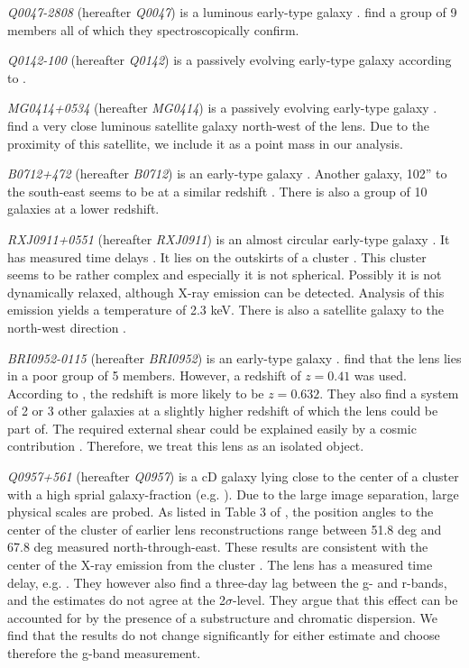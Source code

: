 \documentclass[useAMS,usenatbib]{mn2e}
\begin{document}
\textit{Q0047-2808} (hereafter \textit{Q0047}) is a luminous early-type galaxy \citep{1996MNRAS.278..139W}. \cite{2011ApJ...726...84W} find a group of 9 members all of which they spectroscopically confirm.

\textit{Q0142-100} (hereafter \textit{Q0142}) is a passively evolving early-type galaxy according to \citep{2000ApJ...536..584L,2007A&A...465...51E}.

\textit{MG0414+0534} (hereafter \textit{MG0414}) is a passively evolving early-type galaxy \citep{1999AJ....117.2034T}. \cite{1993AJ....105....1S} find a very close luminous satellite galaxy north-west of the lens. Due to the proximity of this satellite, we include it as a point mass in our analysis.

\textit{B0712+472} (hereafter \textit{B0712}) is an early-type galaxy \citep{1998AJ....115..377F}. Another galaxy, 102'' to the south-east seems to be at a similar redshift \citep{2002AJ....123..627F}. There is also a group of 10 galaxies at a lower redshift.

\textit{RXJ0911+0551} (hereafter \textit{RXJ0911}) is an almost circular early-type galaxy \citep{2012A&A...538A..99S}. It has measured time delays \citep{2002ApJ...572L..11H}. It lies on the outskirts of a cluster \citep{2001ApJ...555....1M}. This cluster seems to be rather complex and especially it is not spherical. Possibly it is not dynamically relaxed, although X-ray emission can be detected. Analysis of this emission yields a temperature of 2.3 keV. There is also a satellite galaxy to the north-west direction \citep{2000ApJ...544L..35K}.

\textit{BRI0952-0115} (hereafter \textit{BRI0952}) is an early-type galaxy \citep{2000ApJ...536..584L,2007A&A...465...51E}. \cite{2006ApJ...641..169M} find that the lens lies in a poor group of 5 members. However, a redshift of $z=0.41$ was used. According to \cite{2007A&A...465...51E}, the redshift is more likely to be $z=0.632$. They also find a system of 2 or 3 other galaxies at a slightly higher redshift of which the lens could be part of. The required external shear could be explained easily by a cosmic contribution \citep{2000ApJ...536..584L}. Therefore, we treat this lens as an isolated object.

\textit{Q0957+561} (hereafter \textit{Q0957}) is a cD galaxy lying close to the center of a cluster with a high sprial galaxy-fraction (e.g. \cite{1992MNRAS.254P..27G,1994A&A...291..411A,1998ApJ...504..661C}). Due to the large image separation, large physical scales are probed. As listed in Table 3 of \cite{2000ApJ...542...74K}, the position angles to the center of the cluster of earlier lens reconstructions range between 51.8 deg and 67.8 deg measured north-through-east. These results are consistent with the center of the X-ray emission from the cluster \citep{1998ApJ...504..661C}. The lens has a measured time delay, e.g. \citep{2012A&A...540A.132S}. They however also find a three-day lag between the g- and r-bands, and the estimates do not agree at the 2$\sigma$-level. They argue that this effect can be accounted for by the presence of a substructure and chromatic dispersion. We find that the results do not change significantly for either estimate and choose therefore the g-band measurement.
\end{document}
